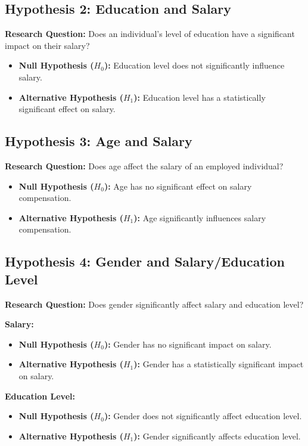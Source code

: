 \subsection{Hypothesis 2: Education and Salary}
\textbf{Research Question:} Does an individual's level of education have a significant impact on their salary?

\begin{itemize}
    \item \textbf{Null Hypothesis ($H_0$):} Education level does not significantly influence salary.
    \item \textbf{Alternative Hypothesis ($H_1$):} Education level has a statistically significant effect on salary.
\end{itemize}

\subsection{Hypothesis 3: Age and Salary}
\textbf{Research Question:} Does age affect the salary of an employed individual?

\begin{itemize}
    \item \textbf{Null Hypothesis ($H_0$):} Age has no significant effect on salary compensation.
    \item \textbf{Alternative Hypothesis ($H_1$):} Age significantly influences salary compensation.
\end{itemize}

\subsection{Hypothesis 4: Gender and Salary/Education Level}
\textbf{Research Question:} Does gender significantly affect salary and education level?

\textbf{Salary:}
\begin{itemize}
    \item \textbf{Null Hypothesis ($H_0$):} Gender has no significant impact on salary.
    \item \textbf{Alternative Hypothesis ($H_1$):} Gender has a statistically significant impact on salary.
\end{itemize}

\textbf{Education Level:}
\begin{itemize}
    \item \textbf{Null Hypothesis ($H_0$):} Gender does not significantly affect education level.
    \item \textbf{Alternative Hypothesis ($H_1$):} Gender significantly affects education level.
\end{itemize}

